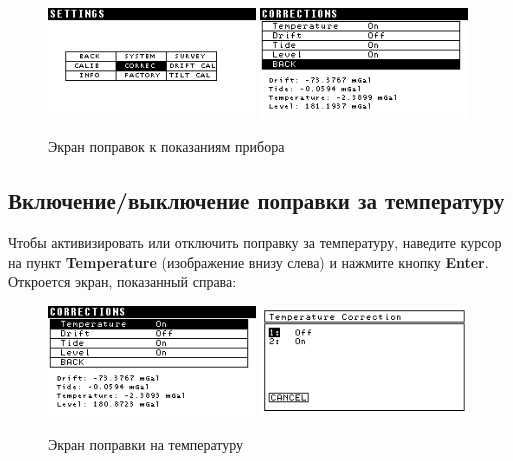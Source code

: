 \begin{figure}[H]
  \centering
  \includegraphics[width=0.49\textwidth]{figures/the_instrument_corrections_screen_1}
  \includegraphics[width=0.49\textwidth]{figures/the_instrument_corrections_screen_2}
  \caption{Экран поправок к показаниям прибора}
  \label{fig:the_instrument_corrections_screen}
\end{figure}

\subsection{Включение/выключение поправки за температуру}

Чтобы активизировать или отключить поправку за температуру, наведите курсор на
пункт \textbf{Temperature} (изображение внизу слева) и нажмите кнопку
\textbf{Enter}. Откроется экран, показанный справа:

\begin{figure}[H]
  \centering
  \includegraphics[width=0.49\textwidth]{figures/the_temperature_correction_screen_1}
  \includegraphics[width=0.49\textwidth]{figures/the_temperature_correction_screen_2}
  \caption{Экран поправки на температуру}
  \label{fig:the_temperature_correction_screen}
\end{figure}

